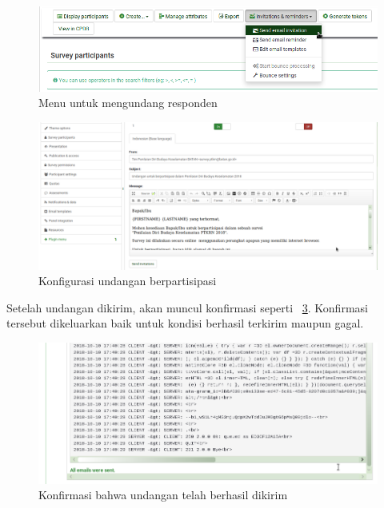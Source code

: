 \begin{figure}
   \begin{center}
     \includegraphics[scale=.5]{pics/undangan.png}
     \caption{Menu untuk mengundang responden}
     \label{fig:undangan}
   \end{center}
 \end{figure} 
 
 \begin{figure}
   \begin{center}
     \includegraphics[scale=.35]{pics/undangan1.png}
     \caption{Konfigurasi undangan berpartisipasi}
     \label{fig:undangan1}
   \end{center}
 \end{figure}
 
 Setelah undangan dikirim, akan muncul konfirmasi seperti \figurename~\ref{fig:undangan2}. Konfirmasi tersebut dikeluarkan baik untuk kondisi berhasil terkirim maupun gagal.
 
 \begin{figure}
   \begin{center}
     \includegraphics[scale=.5]{pics/undangan2.png}
     \caption{Konfirmasi bahwa undangan telah berhasil dikirim}
     \label{fig:undangan2}
   \end{center}
 \end{figure}
 
